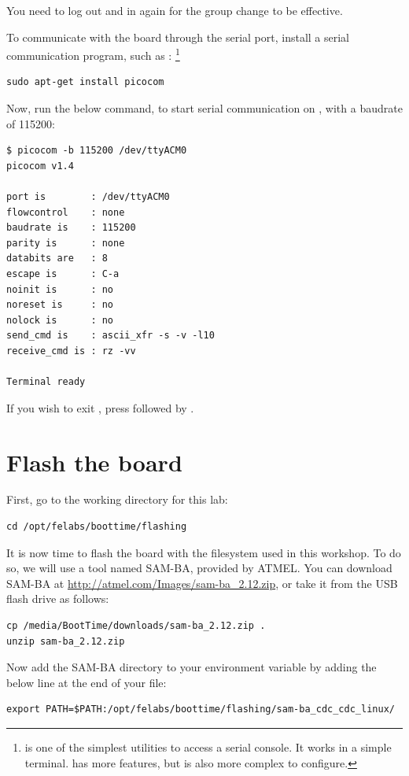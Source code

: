 You need to log out and in again for the group change to be effective.

To communicate with the board through the serial port, install a
serial communication program, such as :
\footnote{ is one of the simplest utilities to access a
serial console. It works in a simple terminal.  has more
features, but is also more complex to configure.}

\begin{verbatim}
sudo apt-get install picocom
\end{verbatim}

Now, run the below command, to start serial communication on
, with a baudrate of 115200:

\begin{verbatim}
$ picocom -b 115200 /dev/ttyACM0
picocom v1.4

port is        : /dev/ttyACM0
flowcontrol    : none
baudrate is    : 115200
parity is      : none
databits are   : 8
escape is      : C-a
noinit is      : no
noreset is     : no
nolock is      : no
send_cmd is    : ascii_xfr -s -v -l10
receive_cmd is : rz -vv

Terminal ready
\end{verbatim}

If you wish to exit , press \code{[Ctrl][a]} followed by
\code{[Ctrl][x]}.

\section{Flash the board}

First, go to the working directory for this lab:

\begin{verbatim}
cd /opt/felabs/boottime/flashing
\end{verbatim}

It is now time to flash the board with the filesystem used in this
workshop. To do so, we will use a tool named SAM-BA, provided by
ATMEL. You can download SAM-BA at
\url{http://atmel.com/Images/sam-ba_2.12.zip}, or take it from the USB
flash drive as follows:

\begin{verbatim}
cp /media/BootTime/downloads/sam-ba_2.12.zip .
unzip sam-ba_2.12.zip
\end{verbatim}

Now add the SAM-BA directory to your  environment variable
by adding the below line at the end of your  file:
\begin{verbatim}
export PATH=$PATH:/opt/felabs/boottime/flashing/sam-ba_cdc_cdc_linux/
\end{verbatim}

